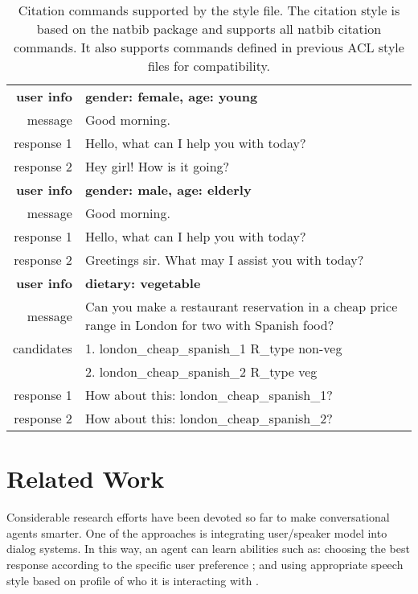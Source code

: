 \documentclass[11pt,a4paper]{article}
\begin{document}
\begin{table}[t]
	\centering
	\small
	\label{intro:example}
	\begin{tabularx}{\linewidth}{rX}
		\toprule
		\textbf{user info} & \textbf{gender: female, age: young} \\
		\cmidrule{1-2}
		message & Good morning. \\
		response 1 & Hello, what can I help you with today? \\
		response 2 & Hey girl! How is it going? \\
		
		\midrule
		\textbf{user info} & \textbf{gender: male, age: elderly} \\
		\cmidrule{1-2}
		message & Good morning. \\
		response 1 & Hello, what can I help you with today? \\
		response 2 & Greetings sir. What may I assist you with today? \\
		
		\midrule
		\textbf{user info} & \textbf{dietary: vegetable} \\
		\cmidrule{1-2}
		message & Can you make a restaurant reservation in a cheap price range in London for two with Spanish food? \\
		candidates & 1. london\_cheap\_spanish\_1 R\_type non-veg \\
		           & 2. london\_cheap\_spanish\_2 R\_type veg \\
		response 1 & How about this: london\_cheap\_spanish\_1? \\
		response 2 & How about this: london\_cheap\_spanish\_2? \\
		\bottomrule
	\end{tabularx}
	\caption{Citation commands supported by the style file.
		The citation style is based on the natbib package and
		supports all natbib citation commands.
		It also supports commands defined in previous ACL style files
		for compatibility.
	}
\end{table}

\section{Related Work}

Considerable research efforts have been devoted so far to make conversational agents smarter. 
One of the approaches is integrating user/speaker model into dialog systems.
In this way, an agent can learn abilities such as: choosing the best response according to the specific user preference \cite{DBLP:journals/corr/JoshiMF17}; and using appropriate speech style based on profile of who it is interacting with \cite{herzig-EtAl:2017:INLG2017}.
\end{document}
